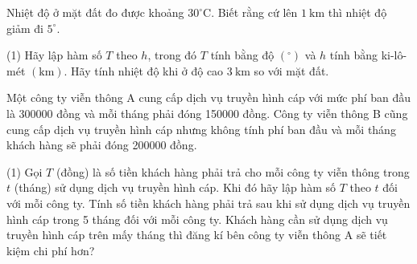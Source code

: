 \begin{vd}
	Nhiệt độ ở mặt đất đo được khoảng $30^{\circ} \mathrm{C}$. Biết rằng cứ lên $1 \mathrm{~km}$ thì nhiệt độ giảm đi $5^{\circ}$.
	\begin{tasks}(1)
		\task Hãy lập hàm số $T$ theo $h$, trong đó $T$ tính bằng độ $\left({ }^{\circ}\right)$ và $h$ tính bằng ki-lô-mét $(\mathrm{km})$.
		\task Hãy tính nhiệt độ khi ở độ cao $3 \mathrm{~km}$ so với mặt đất.
	\end{tasks}
\end{vd}
\begin{vd}%
	Một công ty viễn thông A cung cấp dịch vụ truyền hình cáp với mức phí ban đầu là 300000 đồng và mỗi tháng phải đóng 150000 đồng. Công ty viễn thông B cũng cung cấp dịch vụ truyền hình cáp nhưng không tính phí ban đầu và mỗi tháng khách hàng sẽ phải đóng 200000 đồng.
	\begin{tasks}(1)
		\task Gọi $T$ (đồng) là số tiền khách hàng phải trả cho mỗi công ty viễn thông trong $t$ (tháng) sử dụng dịch vụ truyền hình cáp. Khi đó hãy lập hàm số $T$ theo $t$ đối với mỗi công ty.
		\task Tính số tiền khách hàng phải trả sau khi sử dụng dịch vụ truyền hình cáp trong 5 tháng đối với mỗi công ty.
		\task Khách hàng cần sử dụng dịch vụ truyền hình cáp trên mấy tháng thì đăng kí bên công ty viễn thông A sẽ tiết kiệm chi phí hơn?
	\end{tasks}
\end{vd}
